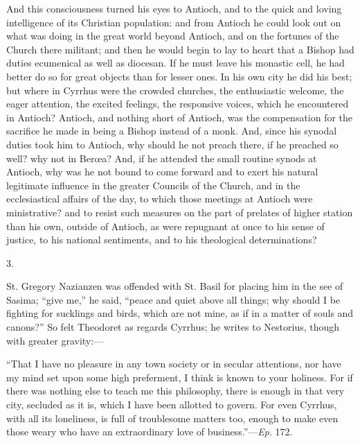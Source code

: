 And this consciousness turned his eyes to Antioch, and to the quick
and loving intelligence of its Christian population: and from Antioch
he could look out on what was doing in the great world beyond Antioch,
and on the fortunes of the Church there militant; and then he would
begin to lay to heart that a Bishop had duties ecumenical as well as
diocesan. If he must leave his monastic cell, he had better do so for
great objects than for lesser ones. In his own city he did his best;
but where in Cyrrhus were the crowded churches, the enthusiastic
welcome, the eager attention, the excited feelings, the responsive
voices, which he encountered in Antioch? Antioch, and nothing short of
Antioch, was the compensation for the sacrifice he made in being a
Bishop instead of a monk. And, since his synodal duties took him to
Antioch, why should he not preach there, if he preached so well? why
not in Berœa? And, if he attended the small routine synods at
Antioch, why was he not bound to come forward and to exert his natural
legitimate influence in the greater Councils of the Church, and in the
ecclesiastical affairs of the day, to which those meetings at Antioch
were ministrative? and to resist such measures on the part of prelates
of higher station than his own, outside of Antioch, as were
repugnant at once to his sense of justice, to his national sentiments,
and to his theological determinations?

3.

St. Gregory Nazianzen was offended with St. Basil for placing him
in the see of Sasima; ``give me,'' he said, ``peace and
quiet above all things; why should I be fighting for sucklings and
birds, which are not mine, as if in a matter of souls and
canons?'' So felt Theodoret as regards Cyrrhus; he writes to
Nestorius, though with greater gravity:—

``That I have no pleasure in any town society or in secular
attentions, nor have my mind set upon some high preferment, I think is
known to your holiness. For if there was nothing else to teach me this
philosophy, there is enough in that very city, secluded as it is,
which I have been allotted to govern. For even Cyrrhus, with all its
loneliness, is full of troublesome matters too, enough to make even
those weary who have an extraordinary love of business.''—\emph{Ep}.
172.

